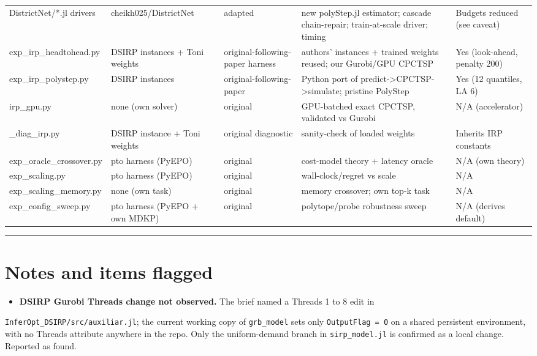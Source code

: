 \documentclass[10pt]{article}
\begin{document}
{\begin{longtable}{p{}p{}p{}p{}p{}}
DistrictNet/*.jl drivers & cheikh025/DistrictNet & adapted & new polyStep.jl estimator; cascade chain-repair; train-at-scale driver; timing & Budgets reduced (see caveat) \\
exp\_irp\_headtohead.py & DSIRP instances + Toni weights & original-following-paper harness & authors' instances + trained weights reused; our Gurobi/GPU CPCTSP & Yes (look-ahead, penalty 200) \\
exp\_irp\_polystep.py & DSIRP instances & original-following-paper & Python port of predict->CPCTSP->simulate; pristine PolyStep & Yes (12 quantiles, LA 6) \\
irp\_gpu.py & none (own solver) & original & GPU-batched exact CPCTSP, validated vs Gurobi & N/A (accelerator) \\
\_diag\_irp.py & DSIRP instance + Toni weights & original diagnostic & sanity-check of loaded weights & Inherits IRP constants \\
exp\_oracle\_crossover.py & pto harness (PyEPO) & original & cost-model theory + latency oracle & N/A (own theory) \\
exp\_scaling.py & pto harness (PyEPO) & original & wall-clock/regret vs scale & N/A \\
exp\_scaling\_memory.py & none (own task) & original & memory crossover; own top-k task & N/A \\
exp\_config\_sweep.py & pto harness (PyEPO + own MDKP) & original & polytope/probe robustness sweep & N/A (derives default) \\
\bottomrule\end{longtable}}

\medskip\hrule\medskip

\section*{Notes and items flagged}

\begin{itemize}\setlength{\itemsep}{2pt}
\item \textbf{DSIRP Gurobi Threads change not observed.} The brief named a Threads 1 to 8 edit in
\end{itemize}
  \texttt{InferOpt\_DSIRP/src/auxiliar.jl}; the current working copy of \texttt{grb\_model} sets only \texttt{OutputFlag = 0} on a shared
  persistent environment, with no Threads attribute anywhere in the repo. Only the uniform-demand branch in
  \texttt{sirp\_model.jl} is confirmed as a local change. Reported as found.
\end{document}
